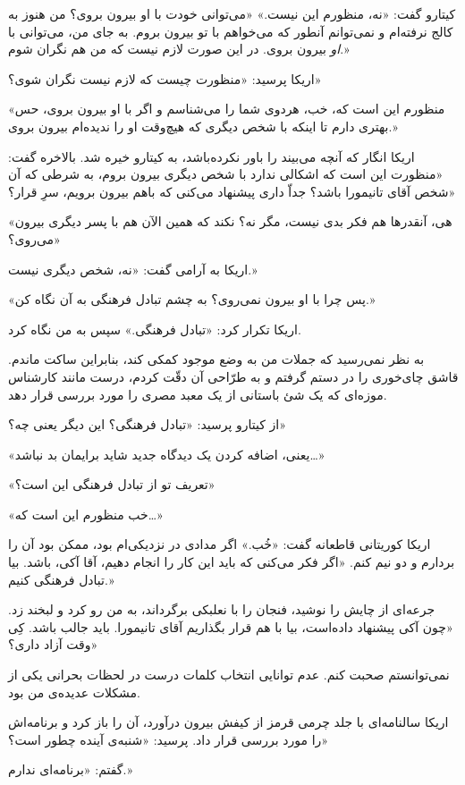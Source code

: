 \documentclass[a5paper]{book}
\begin{document}
کیتارو گفت: «نه، منظورم این نیست.» «می‌توانی خودت با او بیرون بروی؟ من هنوز به کالج نرفته‌ام و نمی‌توانم آنطور که می‌خواهم با تو بیرون بروم. به جای من، می‌توانی با \emph{او} بیرون بروی. در این صورت لازم نیست که من هم نگران شوم.»

اریکا پرسید: «منظورت چیست که لازم نیست نگران شوی؟»

«منظورم این است که، خب، هردوی شما را می‌شناسم و اگر با او بیرون بروی، حس بهتری دارم تا اینکه با شخص دیگری که هیچ‌وقت او را ندیده‌ام بیرون بروی.»

اریکا انگار که آنچه می‌بیند را باور نکرده‌باشد، به کیتارو خیره شد. بالاخره گفت: «منظورت این است که اشکالی ندارد با شخص دیگری بیرون بروم، به شرطی که آن شخص آقای تانیمورا باشد؟ جداّ داری پیشنهاد می‌کنی که باهم بیرون برویم، سرِ قرار؟»

«هی، آنقدرها هم فکر بدی نیست، مگر نه؟ نکند که همین الآن هم با پسر دیگری بیرون می‌روی؟»

اریکا به آرامی گفت: «نه، شخص دیگری نیست.»

«پس چرا با او بیرون نمی‌روی؟ به چشم تبادل فرهنگی به آن نگاه کن.»

اریکا تکرار کرد: «تبادل فرهنگی.» سپس به من نگاه کرد.

به نظر نمی‌رسید که جملات من به وضع موجود کمکی کند، بنابراین ساکت ماندم. قاشق چای‌خوری را در دستم گرفتم و به طرّاحی آن دقّت کردم، درست مانند کارشناس موزه‌ای که یک شئ باستانی از یک معبد مصری را مورد بررسی قرار دهد.

از کیتارو پرسید: «تبادل فرهنگی؟ این دیگر یعنی چه؟»

«یعنی، اضافه کردن یک دیدگاه جدید شاید برایمان بد نباشد\ldots»

«تعریف تو از تبادل فرهنگی این است؟»

«خب منظورم این است که\ldots»

اریکا کوریتانی قاطعانه گفت: «خُب.» اگر مدادی در نزدیکی‌ام بود، ممکن بود آن را بردارم و دو نیم کنم. «اگر فکر می‌کنی که باید این کار را انجام دهیم، آقا آکی، باشد. بیا تبادل فرهنگی کنیم.»

جرعه‌ای از چایش را نوشید، فنجان را با نعلبکی برگرداند، به من رو کرد و لبخند زد. «چون آکی پیشنهاد داده‌است، بیا با هم قرار بگذاریم آقای تانیمورا. باید جالب باشد. کِی وقت آزاد داری؟»

نمی‌توانستم صحبت کنم. عدم توانایی انتخاب کلمات درست در لحظات بحرانی یکی از مشکلات عدیده‌ی من بود.

اریکا سالنامه‌ای با جلد چرمی قرمز از کیفش بیرون درآورد، آن را باز کرد و برنامه‌اش را مورد بررسی قرار داد. پرسید: «شنبه‌ی آینده چطور است؟»

گفتم: «برنامه‌ای ندارم.»
\end{document}
